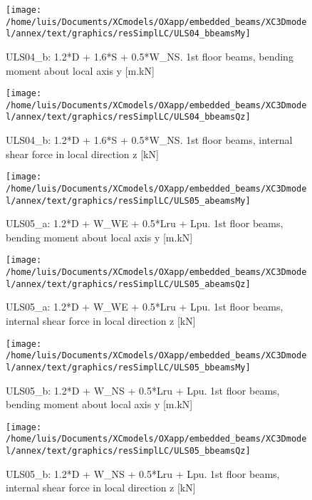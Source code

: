\clearpage
\begin{figure}
\begin{center}
\texttt{[image: /home/luis/Documents/XCmodels/OXapp/embedded\_beams/XC3Dmodel/annex/text/graphics/resSimplLC/ULS04\_bbeamsMy]}
\caption{ULS04_b: 1.2*D + 1.6*S + 0.5*W_NS. 1st floor beams, bending moment about local axis y [m.kN]}
\end{center}
\end{figure}
\begin{figure}
\begin{center}
\texttt{[image: /home/luis/Documents/XCmodels/OXapp/embedded\_beams/XC3Dmodel/annex/text/graphics/resSimplLC/ULS04\_bbeamsQz]}
\caption{ULS04_b: 1.2*D + 1.6*S + 0.5*W_NS. 1st floor beams, internal shear force in local direction z [kN]}
\end{center}
\end{figure}
\clearpage
\begin{figure}
\begin{center}
\texttt{[image: /home/luis/Documents/XCmodels/OXapp/embedded\_beams/XC3Dmodel/annex/text/graphics/resSimplLC/ULS05\_abeamsMy]}
\caption{ULS05_a: 1.2*D + W_WE + 0.5*Lru + Lpu. 1st floor beams, bending moment about local axis y [m.kN]}
\end{center}
\end{figure}
\begin{figure}
\begin{center}
\texttt{[image: /home/luis/Documents/XCmodels/OXapp/embedded\_beams/XC3Dmodel/annex/text/graphics/resSimplLC/ULS05\_abeamsQz]}
\caption{ULS05_a: 1.2*D + W_WE + 0.5*Lru + Lpu. 1st floor beams, internal shear force in local direction z [kN]}
\end{center}
\end{figure}
\clearpage
\begin{figure}
\begin{center}
\texttt{[image: /home/luis/Documents/XCmodels/OXapp/embedded\_beams/XC3Dmodel/annex/text/graphics/resSimplLC/ULS05\_bbeamsMy]}
\caption{ULS05_b: 1.2*D + W_NS + 0.5*Lru + Lpu. 1st floor beams, bending moment about local axis y [m.kN]}
\end{center}
\end{figure}
\begin{figure}
\begin{center}
\texttt{[image: /home/luis/Documents/XCmodels/OXapp/embedded\_beams/XC3Dmodel/annex/text/graphics/resSimplLC/ULS05\_bbeamsQz]}
\caption{ULS05_b: 1.2*D + W_NS + 0.5*Lru + Lpu. 1st floor beams, internal shear force in local direction z [kN]}
\end{center}
\end{figure}
